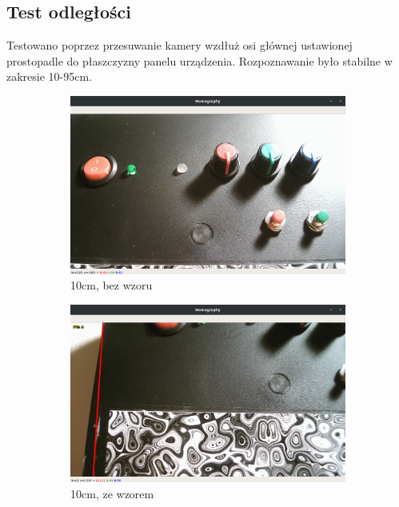 \documentclass[12pt,twoside,polish]{article}
\begin{document}
\subsection{Test odległości}
Testowano poprzez przesuwanie kamery wzdłuż osi głównej ustawionej prostopadle do płaszczyzny panelu urządzenia. Rozpoznawanie było stabilne w zakresie 10-95cm.
\begin{figure}[htb!]
	\begin{subfigure}[b]{0.5\textwidth}
		\includegraphics[width=\textwidth]{test_close1}
		\caption{10cm, bez wzoru}
		\label{test_close1}
	\end{subfigure}
	\begin{subfigure}[b]{0.5\textwidth}
		\includegraphics[width=\textwidth]{test_close2}
		\caption{10cm, ze wzorem}
		\label{test_close2}
	\end{subfigure}
	\begin{subfigure}[b]{0.5\textwidth}

\end{subfigure}
\end{figure}
\end{document}

